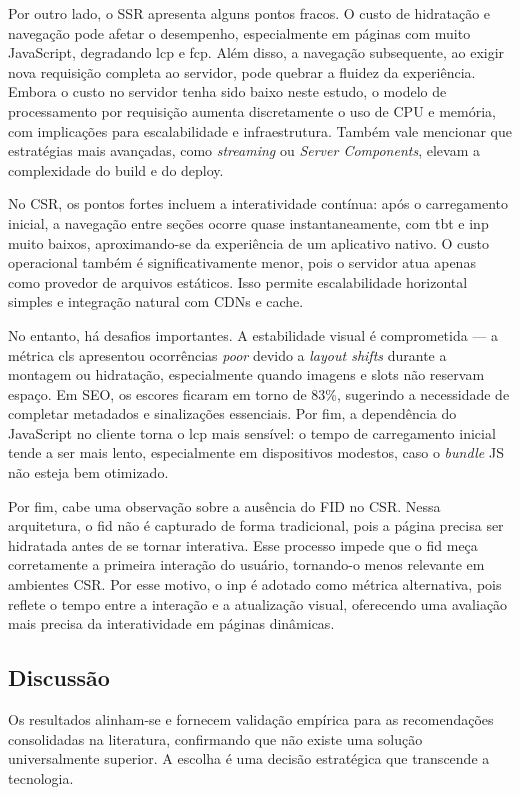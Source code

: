 {Por outro lado, o SSR apresenta alguns pontos fracos. O custo de hidratação e navegação pode afetar o desempenho, especialmente em páginas com muito JavaScript, degradando \acrshort{lcp} e \acrshort{fcp}. Além disso, a navegação subsequente, ao exigir nova requisição completa ao servidor, pode quebrar a fluidez da experiência. Embora o custo no servidor tenha sido baixo neste estudo, o modelo de processamento por requisição aumenta discretamente o uso de CPU e memória, com implicações para escalabilidade e infraestrutura. Também vale mencionar que estratégias mais avançadas, como \emph{streaming} ou \emph{Server Components}, elevam a complexidade do build e do deploy.

No CSR, os pontos fortes incluem a interatividade contínua: após o carregamento inicial, a navegação entre seções ocorre quase instantaneamente, com \acrshort{tbt} e \acrshort{inp} muito baixos, aproximando-se da experiência de um aplicativo nativo. O custo operacional também é significativamente menor, pois o servidor atua apenas como provedor de arquivos estáticos. Isso permite escalabilidade horizontal simples e integração natural com CDNs e cache.

No entanto, há desafios importantes. A estabilidade visual é comprometida — a métrica \acrshort{cls} apresentou ocorrências \textit{poor} devido a \emph{layout shifts} durante a montagem ou hidratação, especialmente quando imagens e slots não reservam espaço. Em SEO, os escores ficaram em torno de 83\%, sugerindo a necessidade de completar metadados e sinalizações essenciais. Por fim, a dependência do JavaScript no cliente torna o \acrshort{lcp} mais sensível: o tempo de carregamento inicial tende a ser mais lento, especialmente em dispositivos modestos, caso o \emph{bundle} JS não esteja bem otimizado.

Por fim, cabe uma observação sobre a ausência do FID no CSR. Nessa arquitetura, o \acrfull{fid} não é capturado de forma tradicional, pois a página precisa ser hidratada antes de se tornar interativa. Esse processo impede que o \acrshort{fid} meça corretamente a primeira interação do usuário, tornando-o menos relevante em ambientes CSR. Por esse motivo, o \acrfull{inp} é adotado como métrica alternativa, pois reflete o tempo entre a interação e a atualização visual, oferecendo uma avaliação mais precisa da interatividade em páginas dinâmicas.


\subsection{Discussão}
\label{subsec:discussao-comparativa}
Os resultados alinham-se e fornecem validação empírica para as recomendações consolidadas na literatura, confirmando que não existe uma solução universalmente superior. A escolha é uma decisão estratégica que transcende a tecnologia.

}

